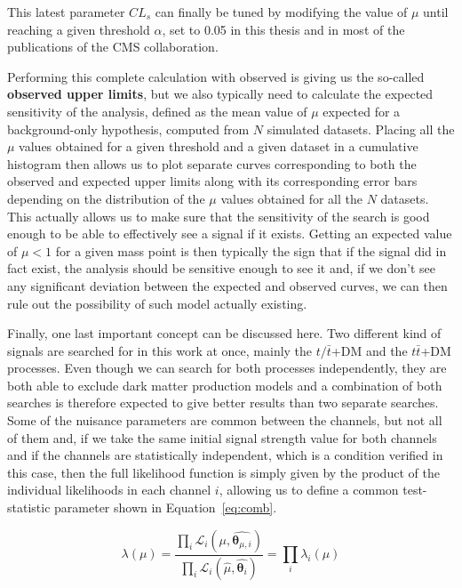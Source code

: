 \documentclass[a4paper, 10pt, openright]{report}
\begin{document}
This latest parameter $CL_s$ can finally be tuned by modifying the value of $\mu$ until reaching a given threshold $\alpha$, set to 0.05 in this thesis and in most of the publications of the \ac{CMS} collaboration.

Performing this complete calculation with observed is giving us the so-called \textbf{observed upper limits}, but we also typically need to calculate the expected sensitivity of the analysis, defined as the mean value of $\mu$ expected for a background-only hypothesis, computed from $N$ simulated datasets. Placing all the $\mu$ values obtained for a given threshold and a given dataset in a cumulative histogram then allows us to plot separate curves corresponding to both the observed and expected upper limits along with its corresponding error bars depending on the distribution of the $\mu$ values obtained for all the $N$ datasets. This actually allows us to make sure that the sensitivity of the search is good enough to be able to effectively see a signal if it exists. Getting an expected value of $\mu < 1$ for a given mass point is then typically the sign that if the signal did in fact exist, the analysis should be sensitive enough to see it and, if we don't see any significant deviation between the expected and observed curves, we can then rule out the possibility of such model actually existing.

Finally, one last important concept can be discussed here. Two different kind of signals are searched for in this work at once, mainly the $t/\bar t$+DM and the $t \bar t$+DM processes. Even though we can search for both processes independently, they are both able to exclude dark matter production models and a combination of both searches is therefore expected to give better results than two separate searches. Some of the nuisance parameters are common between the channels, but not all of them and, if we take the same initial signal strength value for both channels and if the channels are statistically independent, which is a condition verified in this case, then the full likelihood function is simply given by the product of the individual likelihoods in each channel $i$, allowing us to define a common test-statistic parameter shown in Equation~\ref{eq:comb}.

\begin{equation}
\label{eq:comb}
\lambda (\mu) = \frac{\prod_i \mathcal{L}_i(\mu, \hat{\bm \theta_{\mu, i}})}{\prod_i \mathcal{L}_i (\hat{\mu}, \hat{\bm \theta_i})} = \prod_i \lambda_i (\mu)
\end{equation}
\end{document}
